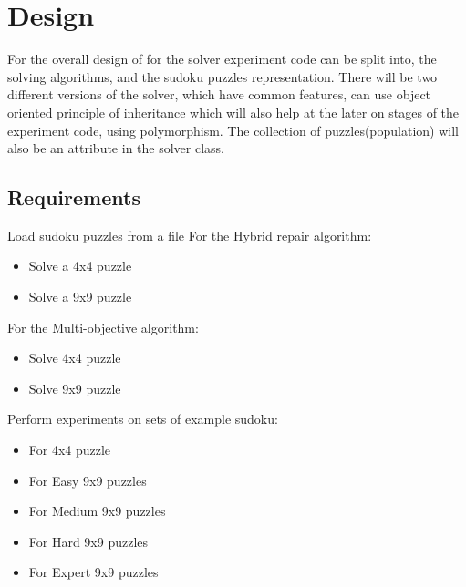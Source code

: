 \documentclass[a4paper,11pt]{article}
\begin{document}
\section{Design}
For the overall design of for the solver experiment code can be split into, the solving algorithms, and the sudoku puzzles representation. There will be two different versions of the solver, which have common features, can use object oriented principle of inheritance which will also help at the later on stages of the experiment code, using polymorphism. The collection of puzzles(population) will also be an attribute in the solver class.

\subsection{Requirements}

Load sudoku puzzles from a file\newline
For the Hybrid repair algorithm:
\begin{itemize}
	\item Solve a 4x4 puzzle  
	\item Solve a 9x9 puzzle
\end{itemize}
For the Multi-objective algorithm:
\begin{itemize}
	\item Solve 4x4 puzzle
	\item Solve 9x9 puzzle
\end{itemize}
Perform experiments on sets of example sudoku:
\begin{itemize}
	\item For 4x4 puzzle
	\item For Easy 9x9 puzzles
	\item For Medium 9x9 puzzles
	\item For Hard 9x9 puzzles
	\item For Expert 9x9 puzzles
\end{itemize}
\end{document}
